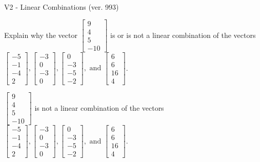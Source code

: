 \begin{exercise}
  \begin{exerciseTitle}V2 - Linear Combinations (ver. 993)\end{exerciseTitle}
  \begin{exerciseStatement}
    Explain why the vector \(\left[\begin{array}{c}
9 \\
4 \\
5 \\
-10
\end{array}\right]\)  is or is not a linear 
	combination of the vectors \(\left[\begin{array}{c}
-5 \\
-1 \\
-4 \\
2
\end{array}\right] , \left[\begin{array}{c}
-3 \\
0 \\
-3 \\
0
\end{array}\right] , \left[\begin{array}{c}
0 \\
-3 \\
-5 \\
-2
\end{array}\right] , \text{ and } \left[\begin{array}{c}
6 \\
6 \\
16 \\
4
\end{array}\right]\).
	


  \end{exerciseStatement}
  \begin{exerciseAnswer}
   \(\left[\begin{array}{c}
9 \\
4 \\
5 \\
-10
\end{array}\right]\) 
  	 is not  
	a linear combination of the vectors \(\left[\begin{array}{c}
-5 \\
-1 \\
-4 \\
2
\end{array}\right] , \left[\begin{array}{c}
-3 \\
0 \\
-3 \\
0
\end{array}\right] , \left[\begin{array}{c}
0 \\
-3 \\
-5 \\
-2
\end{array}\right] , \text{ and } \left[\begin{array}{c}
6 \\
6 \\
16 \\
4
\end{array}\right]\).


\end{exerciseAnswer}
\end{exercise}
